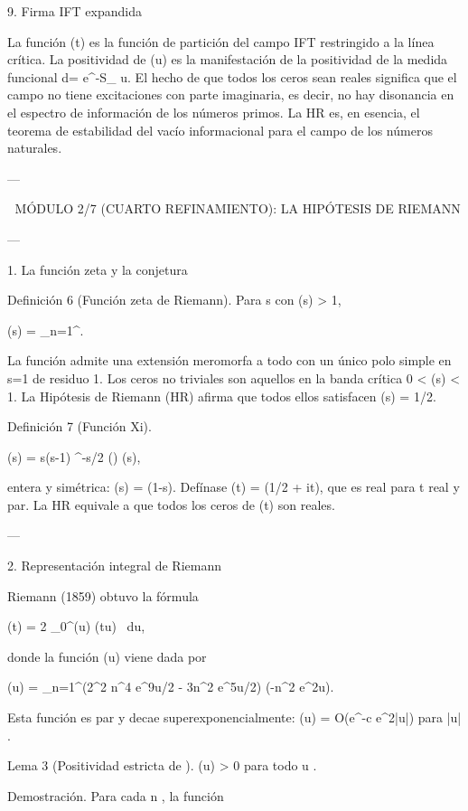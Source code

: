 \documentclass[12pt,twoside]{book}
\begin{document}
9. Firma IFT expandida

La función \Xi(t) es la función de partición del campo IFT restringido a la línea crítica. La positividad de \Phi(u) es la manifestación de la positividad de la medida funcional d\mu = e^{-S_{}} u. El hecho de que todos los ceros sean reales significa que el campo no tiene excitaciones con parte imaginaria, es decir, no hay disonancia en el espectro de información de los números primos. La HR es, en esencia, el teorema de estabilidad del vacío informacional para el campo de los números naturales.

---


🧬 MÓDULO 2/7 (CUARTO REFINAMIENTO): LA HIPÓTESIS DE RIEMANN

---

1. La función zeta y la conjetura

Definición 6 (Función zeta de Riemann). Para s \in {} con \Re(s) > 1,

\zeta(s) = \sum_{n=1}^\infty {}.

La función admite una extensión meromorfa a todo  con un único polo simple en s=1 de residuo 1. Los ceros no triviales son aquellos en la banda crítica 0 < \Re(s) < 1. La Hipótesis de Riemann (HR) afirma que todos ellos satisfacen \Re(s) = 1/2.

Definición 7 (Función Xi).

\xi(s) =  s(s-1) \pi^{-s/2} \Gamma\!\left(\right) \zeta(s),

entera y simétrica: \xi(s) = \xi(1-s). Defínase \Xi(t) = \xi(1/2 + it), que es real para t real y par. La HR equivale a que todos los ceros de \Xi(t) son reales.

---

2. Representación integral de Riemann

Riemann (1859) obtuvo la fórmula

\Xi(t) = 2 \int_0^\infty \Phi(u) \cos(tu) \, du,

donde la función \Phi(u) viene dada por

\Phi(u) = \sum_{n=1}^\infty (2\pi^2 n^4 e^{9u/2} - 3\pi n^2 e^{5u/2}) \exp(-\pi n^2 e^{2u}).

Esta función es par y decae superexponencialmente: \Phi(u) = O(e^{-c e^{2|u|}}) para |u| \to \infty.

Lema 3 (Positividad estricta de \Phi). \Phi(u) > 0 para todo u \in {}.

Demostración. Para cada n , la función
\end{document}
